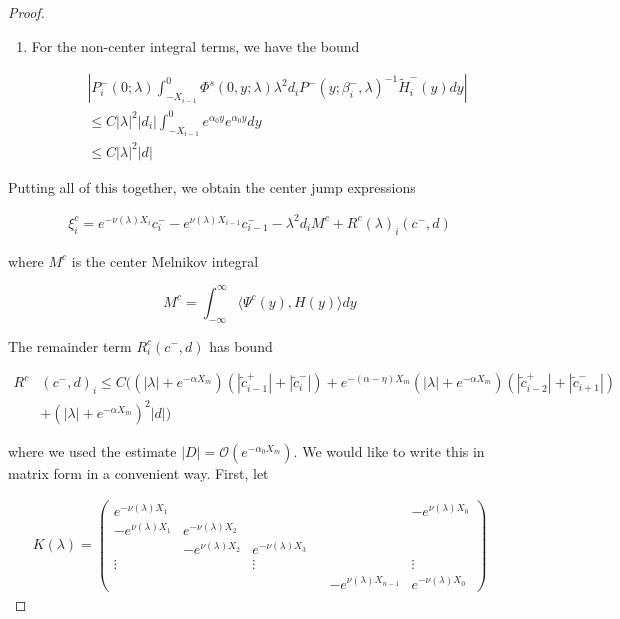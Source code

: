 \documentclass[thesis.tex]{subfiles}
\begin{document}
\begin{lemma}
\begin{proof}
\begin{enumerate}
\item For the non-center integral terms, we have the bound

\begin{align*}
&\left| P_i^-(0; \lambda) 
\int_{-X_{i-1}}^0 \Phi^s(0, y; \lambda) \lambda^2 d_i P^-(y; \beta_i^-, \lambda)^{-1} \tilde{H}_i^-(y) dy \right| \\
&\leq C |\lambda|^2 |d_i| \int_{-X_{i-1}}^0 e^{\alpha_0 y} e^{\alpha_0 y} dy \\
&\leq C |\lambda|^2 |d|
\end{align*}

\end{enumerate}

Putting all of this together, we obtain the center jump expressions

\begin{align*}
\xi^c_i = e^{-\nu(\lambda) X_i} c_i^- - e^{\nu(\lambda) X_{i-1}} c_{i-1}^- - \lambda^2 d_i M^c + R^c(\lambda)_i(c^-, d)
\end{align*}

where $M^c$ is the center Melnikov integral

\[
M^c = \int_{-\infty}^\infty \langle \Psi^c(y), H(y) \rangle dy 
\]

The remainder term $R^c_i(c^-, d)$ has bound

\begin{align*}
R^c&(c^-, d)_i \leq C \Big(
(|\lambda| + e^{-\alpha X_m})(|\tilde{c}_{i-1}^+| + |\tilde{c}_{i}^-|) + e^{-(\alpha - \eta) X_m } (|\lambda| + e^{-\alpha X_m})(  |\tilde{c}_{i-2}^+| + |\tilde{c}_{i+1}^-|)  \\
&+ (|\lambda| + e^{-\alpha X_m})^2 |d|
\Big)
\end{align*}

where we used the estimate $|D| = \mathcal{O}(e^{-\alpha_0 X_m})$. We would like to write this in matrix form in a convenient way. First, let

\begin{align*}
K(\lambda) =  
\begin{pmatrix}
e^{-\nu(\lambda)X_1} & & & & & -e^{\nu(\lambda)X_0} \\
-e^{\nu(\lambda)X_1} & e^{-\nu(\lambda)X_2} \\
& -e^{\nu(\lambda)X_2} & e^{-\nu(\lambda)X_3} \\
\vdots & & \vdots & &&  \vdots \\
& & & & -e^{\nu(\lambda)X_{n-1}} & e^{-\nu(\lambda)X_0} 
\end{pmatrix}
\end{align*}


\end{proof}
\end{lemma}
\end{document}
